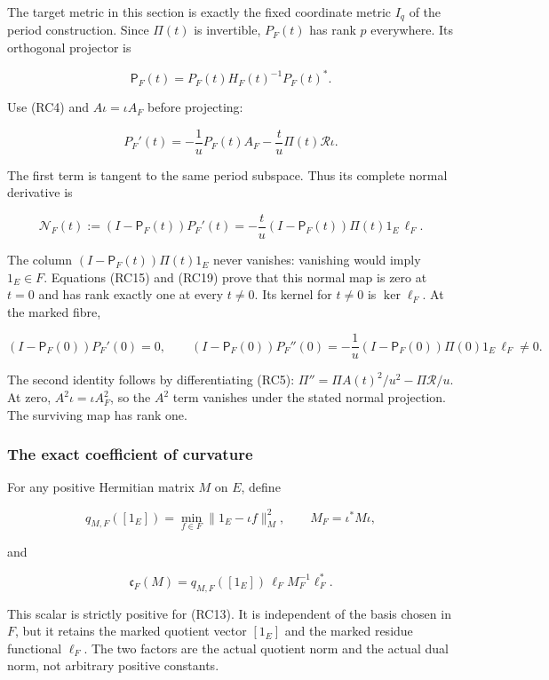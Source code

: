 The target metric in this section is exactly the fixed coordinate metric \(I_q\) of the period construction. Since \(\Pi(t)\) is invertible, \(P_F(t)\) has rank \(p\) everywhere. Its orthogonal projector is

\[
\mathsf P_F(t)=P_F(t)H_F(t)^{-1}P_F(t)^*.
\tag{RC17}
\]

Use (RC4) and \(A\iota=\iota A_F\) before projecting:

\[
P_F'(t)=-\frac1uP_F(t)A_F
-\frac t u\Pi(t)\mathcal R\iota.
\tag{RC18}
\]

The first term is tangent to the same period subspace. Thus its complete normal derivative is

\[
\boxed{\mathcal N_F(t):=(I-\mathsf P_F(t))P_F'(t)
=-\frac t u (I-\mathsf P_F(t))\Pi(t)1_E\,\ell_F.}
\tag{RC19}
\]

The column \((I-\mathsf P_F(t))\Pi(t)1_E\) never vanishes: vanishing would imply \(1_E\in F\). Equations (RC15) and (RC19) prove that this normal map is zero at \(t=0\) and has rank exactly one at every \(t\ne0\). Its kernel for \(t\ne0\) is \(\ker\ell_F\). At the marked fibre,

\[
\boxed{(I-\mathsf P_F(0))P_F'(0)=0,
\qquad (I-\mathsf P_F(0))P_F''(0)
=-\frac1u(I-\mathsf P_F(0))\Pi(0)1_E\,\ell_F\ne0.}
\tag{RC20}
\]

The second identity follows by differentiating (RC5): \(\Pi''=\Pi A(t)^2/u^2-\Pi\mathcal R/u\). At zero, \(A^2\iota=\iota A_F^2\), so the \(A^2\) term vanishes under the stated normal projection. The surviving map has rank one.

\subsubsection{The exact coefficient of curvature}\label{endpoint-residue_original--the-exact-coefficient-of-curvature}

For any positive Hermitian matrix \(M\) on \(E\), define

\[
q_{M,F}([1_E])=\min_{f\in F}\|1_E-\iota f\|_M^2,
\qquad M_F=\iota^*M\iota,
\tag{RC21}
\]

and

\[
\boxed{\mathfrak c_F(M)
=q_{M,F}([1_E])\,\ell_F M_F^{-1}\ell_F^*.}
\tag{RC22}
\]

This scalar is strictly positive for (RC13). It is independent of the basis chosen in \(F\), but it retains the marked quotient vector \([1_E]\) and the marked residue functional \(\ell_F\). The two factors are the actual quotient norm and the actual dual norm, not arbitrary positive constants.

